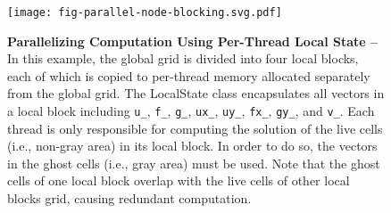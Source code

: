 
\begin{figure}[h]

  \centering
  \texttt{[image: fig-parallel-node-blocking.svg.pdf]}

  \caption{\textbf{Parallelizing Computation Using Per-Thread Local State --}
    In this example, the global grid is divided into four local blocks,
    each of which is copied to per-thread memory allocated separately
    from the global grid. The LocalState class encapsulates all vectors
    in a local block including \texttt{u\_}, \texttt{f\_}, \texttt{g\_},
    \texttt{ux\_}, \texttt{uy\_}, \texttt{fx\_}, \texttt{gy\_}, and
    \texttt{v\_}. Each thread is only responsible for computing the
    solution of the live cells (i.e., non-gray area) in its local
    block. In order to do so, the vectors in the ghost cells (i.e., gray
    area) must be used. Note that the ghost cells of one local block
    overlap with the live cells of other local blocks grid, causing
    redundant computation. }

  \label{fig-parallel-node-blocking}

\end{figure}
